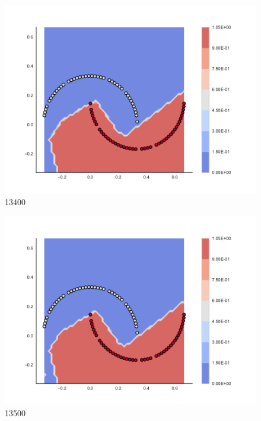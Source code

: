 \begin{subfigure}[b]{0.09\textwidth}
    \includegraphics[clip, trim=2.35cm 1.75cm 4.5cm 0cm,width=\textwidth]{img/convergence/13400.pdf}
    \caption{13400}
    \label{fig:convergence_13400}
\end{subfigure}
%
\begin{subfigure}[b]{0.09\textwidth}
    \includegraphics[clip, trim=2.35cm 1.75cm 4.5cm 0cm,width=\textwidth]{img/convergence/13500.pdf}
    \caption{13500}
    \label{fig:convergence_13500}
\end{subfigure}
%
